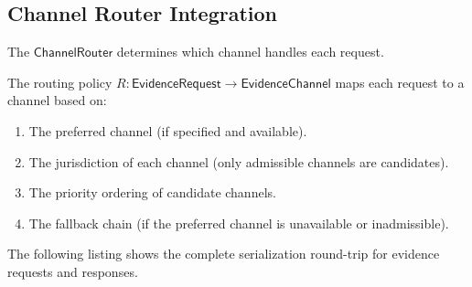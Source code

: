 \documentclass[11pt]{article}
\newcommand{\EvChan}{\mathsf{EvidenceChannel}}
\newcommand{\ChanRouter}{\mathsf{ChannelRouter}}
\newcommand{\EvReq}{\mathsf{EvidenceRequest}}
\begin{document}
\subsection{Channel Router Integration}
\label{sec:infra:router}

The $\ChanRouter$ determines which channel handles each request.

\begin{definition}
\label{def:routing}
The routing policy $R : \EvReq \to \EvChan$ maps each request to
a channel based on:
\begin{enumerate}
\item The preferred channel (if specified and available).
\item The jurisdiction of each channel (only admissible channels
  are candidates).
\item The priority ordering of candidate channels.
\item The fallback chain (if the preferred channel is unavailable
  or inadmissible).
\end{enumerate}
\end{definition}

The following listing shows the complete serialization round-trip
for evidence requests and responses.
\end{document}
